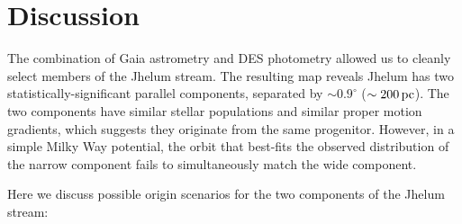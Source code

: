 \documentclass[twocolumn]{aastex62}
\begin{document}
\section{Discussion}
\label{sec:discussion}
The combination of Gaia astrometry and DES photometry allowed us to cleanly select members of the Jhelum stream.
The resulting map reveals Jhelum has two statistically-significant parallel components, separated by $\sim0.9^\circ$ ($\sim200\,\rm pc$).
The two components have similar stellar populations and similar proper motion gradients, which suggests they originate from the same progenitor.
However, in a simple Milky Way potential, the orbit that best-fits the observed distribution of the narrow component fails to simultaneously match the wide component.

Here we discuss possible origin scenarios for the two components of the Jhelum stream:
\end{document}
